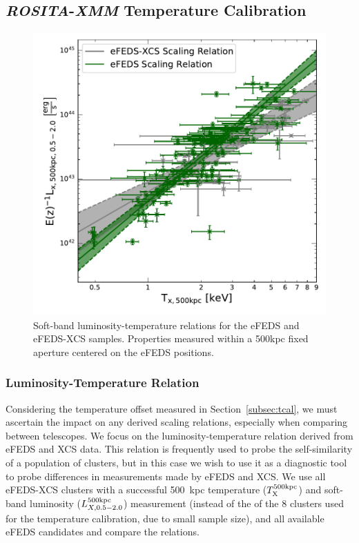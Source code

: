 \documentclass[fleqn,usenatbib]{mnras}
\begin{document}
\subsection{{\em{}ROSITA}-{\em XMM} Temperature Calibration}
\begin{figure}
    \centering
    \includegraphics[width=1\columnwidth]{images/efeds_xcs_wdata_lt52.pdf}
    \caption[]{Soft-band luminosity-temperature relations for the eFEDS and eFEDS-XCS samples. Properties measured within a 500kpc fixed aperture centered on the eFEDS positions.}
    \label{fig:efedsandxcslt}
\end{figure}

\subsubsection{Luminosity-Temperature Relation}
\label{subsubsec:LT}
Considering the temperature offset measured in Section~\ref{subsec:tcal}, we must ascertain the impact on any  derived scaling relations, especially when comparing between telescopes.  We focus on the luminosity-temperature relation derived from eFEDS and XCS data.  This relation is frequently used to probe the self-similarity of a population of clusters, but in this case we wish to use it as a diagnostic tool to probe differences in measurements made by eFEDS and XCS.  We use all eFEDS-XCS clusters with a successful 500~kpc temperature ($T^{\rm 500kpc}_{\rm X}$) and soft-band luminosity ($L^{\rm 500kpc}_{X,0.5-2.0}$) measurement (instead of the of the 8 clusters used for the temperature calibration, due to small sample size), and all available eFEDS candidates and compare the relations.  
\end{document}
